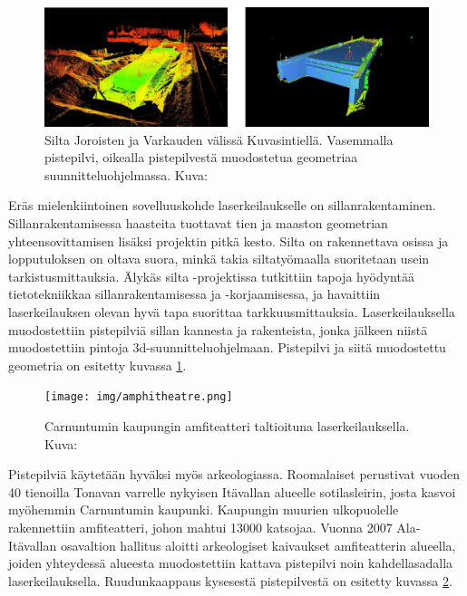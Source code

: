 \begin{figure}
    \centering
    \includegraphics[width=\textwidth]{img/silta.png}
    \caption{Silta Joroisten ja Varkauden välissä Kuvasintiellä. Vasemmalla pistepilvi, oikealla pistepilvestä muodostetua geometriaa suunnitteluohjelmassa. Kuva: \cite{silta}}
    \label{silt}
\end{figure}

Eräs mielenkiintoinen sovelluuskohde laserkeilaukselle on sillanrakentaminen. Sillanrakentamisessa haasteita tuottavat tien ja maaston geometrian yhteensovittamisen lisäksi projektin pitkä kesto. Silta on rakennettava osissa ja lopputuloksen on oltava suora, minkä takia siltatyömaalla suoritetaan usein tarkistusmittauksia. Älykäs silta -projektissa tutkittiin tapoja hyödyntää tietotekniikkaa sillanrakentamisessa ja -korjaamisessa, ja havaittiin laserkeilauksen olevan hyvä tapa suorittaa tarkkuusmittauksia. Laserkeilauksella muodostettiin pistepilviä sillan kannesta ja rakenteista, jonka jälkeen niistä muodostettiin pintoja 3d-suunnitteluohjelmaan. Pistepilvi ja siitä muodostettu geometria on esitetty kuvassa \ref{silt}. \cite{silta}   

\begin{figure}
    \centering
    \texttt{[image: img/amphitheatre.png]}
    \caption{Carnuntumin kaupungin amfiteatteri taltioituna laserkeilauksella. Kuva: \cite{Amphitheatre}}
    \label{amfi}
\end{figure}

Pistepilviä käytetään hyväksi myös arkeologiassa. Roomalaiset perustivat vuoden 40 tienoilla Tonavan varrelle nykyisen Itävallan alueelle
sotilasleirin, josta kasvoi myöhemmin Carnuntumin kaupunki. Kaupungin muurien ulkopuolelle rakennettiin amfiteatteri, johon mahtui 13000 katsojaa.
Vuonna 2007 Ala-Itävallan osavaltion hallitus aloitti arkeologiset kaivaukset amfiteatterin alueella, joiden yhteydessä alueesta muodostettiin kattava pistepilvi noin kahdellasadalla laserkeilauksella. Ruudunkaappaus kysesestä pistepilvestä on esitetty kuvassa \ref{amfi}. \cite{Carnuntum}

